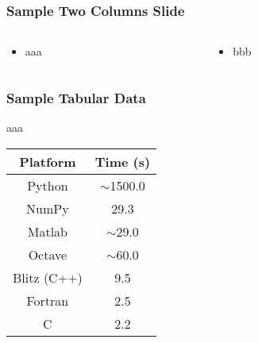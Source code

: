 \begin{frame}[fragile]\frametitle{Sample Two Columns Slide}
\begin{columns}
    \begin{column}[T]{0.6\linewidth}
      \begin{itemize}
		\item aaa
	  \end{itemize}

    \end{column}
    \begin{column}[T]{0.4\linewidth}
      \begin{itemize}
		\item bbb
	  \end{itemize}
    \end{column}
  \end{columns}
\end{frame}

\begin{frame}[fragile]\frametitle{Sample Tabular Data}

aaa

\begin{tabular}{|c|c|}
	\hline
	Platform & Time (s) \\
	\hline \hline
	Python & $\sim$1500.0 \\
	\hline
	NumPy & 29.3 \\
	\hline
	Matlab & $\sim$29.0 \\
	\hline
	Octave & $\sim$60.0 \\
	\hline
	Blitz (C++) & 9.5 \\
	\hline
	Fortran & 2.5 \\
	\hline
	C & 2.2 \\
	\hline
\end{tabular}

\end{frame}
